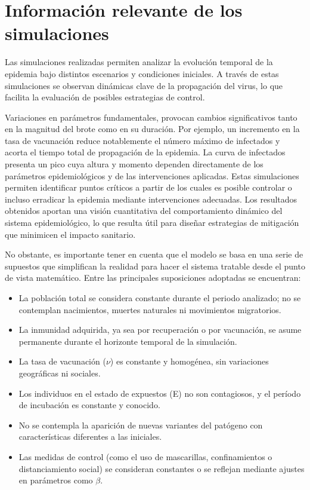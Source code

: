 \section{Información relevante de los simulaciones}

Las simulaciones realizadas permiten analizar la evolución temporal de la epidemia bajo distintos escenarios y condiciones iniciales. A través de estas simulaciones se observan dinámicas clave de la propagación del virus, lo que facilita la evaluación de posibles estrategias de control.

 Variaciones en parámetros fundamentales, provocan cambios significativos tanto en la magnitud del brote como en su duración. Por ejemplo, un incremento en la tasa de vacunación reduce notablemente el número máximo de infectados y acorta el tiempo total de propagación de la epidemia. La curva de infectados presenta un pico cuya altura y momento dependen directamente de los parámetros epidemiológicos y de las intervenciones aplicadas.
Estas simulaciones permiten identificar puntos críticos a partir de los cuales es posible controlar o incluso erradicar la epidemia mediante intervenciones adecuadas. Los resultados obtenidos aportan una visión cuantitativa del comportamiento dinámico del sistema epidemiológico, lo que resulta útil para diseñar estrategias de mitigación que minimicen el impacto sanitario.

No obstante, es importante tener en cuenta que el modelo se basa en una serie de supuestos que simplifican la realidad para hacer el sistema tratable desde el punto de vista matemático. Entre las principales suposiciones adoptadas se encuentran:

\begin{itemize}
    \item La población total se considera constante durante el periodo analizado; no se contemplan nacimientos, muertes naturales ni movimientos migratorios.
    \item La inmunidad adquirida, ya sea por recuperación o por vacunación, se asume permanente durante el horizonte temporal de la simulación.
    \item La tasa de vacunación (\(\nu\)) es constante y homogénea, sin variaciones geográficas ni sociales.
    \item Los individuos en el estado de expuestos (E) no son contagiosos, y el período de incubación es constante y conocido.
    \item No se contempla la aparición de nuevas variantes del patógeno con características diferentes a las iniciales.
    \item Las medidas de control (como el uso de mascarillas, confinamientos o distanciamiento social) se consideran constantes o se reflejan mediante ajustes en parámetros como \(\beta\).
\end{itemize}

